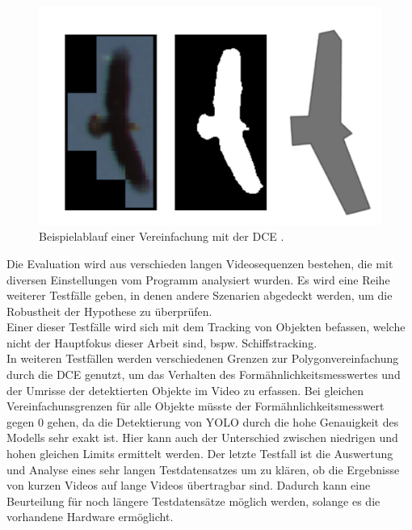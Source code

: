 {\begin{figure}[ht]
	\vspace{-0.5cm}
	   \centering
	   \includegraphics*[scale = 0.5, keepaspectratio, trim=2 2 2 2 ]{images/Example_bird.png}
	   \caption[Beispielablauf der Segmentierung und DCE]{Beispielablauf einer Vereinfachung mit der DCE \citep{Dorr2017}.}
	   \label{Bsp_Dorr}
\end{figure}
Die Evaluation wird aus verschieden langen Videosequenzen bestehen, die mit diversen Einstellungen vom Programm analysiert wurden. Es wird eine Reihe weiterer Testfälle geben, in denen andere Szenarien abgedeckt werden, um die Robustheit der Hypothese zu überprüfen. \\
Einer dieser Testfälle wird sich mit dem Tracking von Objekten befassen, welche nicht der Hauptfokus dieser Arbeit sind, bspw. Schiffstracking. \\
In weiteren Testfällen werden verschiedenen Grenzen zur Polygonvereinfachung durch die DCE genutzt, um das Verhalten des Formähnlichkeitsmesswertes und der Umrisse der detektierten Objekte im Video zu erfassen. Bei gleichen Vereinfachunsgrenzen für alle Objekte müsste der Formähnlichkeitsmesswert gegen 0 gehen, da die Detektierung von YOLO durch die hohe Genauigkeit des Modells sehr exakt ist. Hier kann auch der Unterschied zwischen niedrigen und hohen gleichen Limits ermittelt werden. Der letzte Testfall ist die Auswertung und Analyse eines sehr langen Testdatensatzes um zu klären, ob die Ergebnisse von kurzen Videos auf lange Videos übertragbar sind. Dadurch kann eine Beurteilung für noch längere Testdatensätze möglich werden, solange es die vorhandene Hardware ermöglicht.



}


